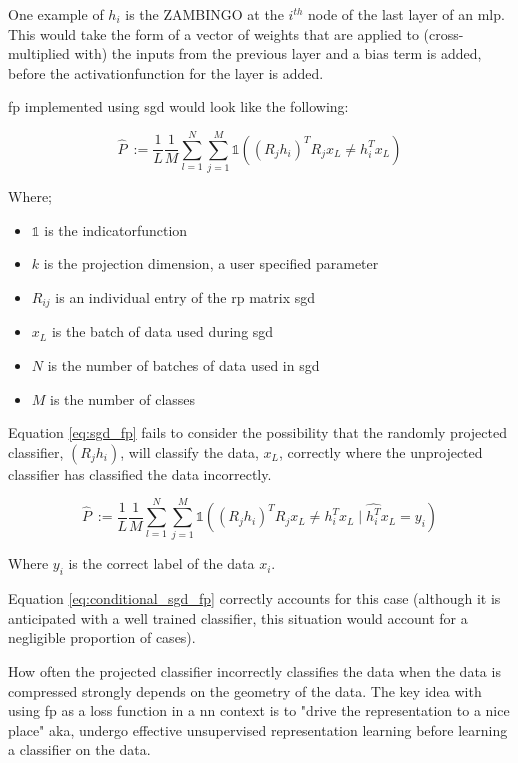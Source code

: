 One example of $h_i$ is the ZAMBINGO at the $i^{th}$ node of the last layer of an \gls{mlp}. This would take the form of a vector of weights that are applied to (cross-multiplied with) the inputs from the previous layer and a bias term is added, before the \gls{activationfunction} for the layer is added.
\bigskip

\bigskip

 \gls{fp} implemented using  \gls{sgd} would look like the following:

\begin{equation}
\label{eq:sgd_fp}
\hat{P}\ := \frac{1}{L}\frac{1}{M}\sum_{l = 1}^N \sum_{j = 1}^M \mathds{1}((R_j h_i)^T R_jx_L \neq h_i^Tx_L)  
\end{equation}

Where;  \smallskip

\begin{itemize}
\item $\mathds{1}$ is the \gls{indicatorfunction}  
\item $k$ is the projection dimension, a user specified parameter 
\item $R_{ij}$ is an individual entry of the \gls{rp} matrix  \gls{sgd} 
\item $x_L$ is the batch of data used during  \gls{sgd}  
\item $N$ is the number of batches of data used in  \gls{sgd}  
\item $M$ is the number of classes %
\end{itemize}

Equation \ref{eq:sgd_fp} fails to consider the possibility that the randomly projected classifier,  $(R_j h_i)$, will classify the data, $x_L$, correctly where the unprojected classifier has classified the data incorrectly.
\bigskip

\begin{equation}
\label{eq:conditional_sgd_fp}
\hat{P}\ := \frac{1}{L}\frac{1}{M}\sum_{l = 1}^N \sum_{j = 1}^M  \mathds{1}( (R_j h_i)^T R_jx_L \neq h_i^Tx_L \mid \hat{h_i^T}x_L = y_i )  
\end{equation}

Where $y_i$ is the correct label of the data $x_i$. 
\bigskip

Equation \ref{eq:conditional_sgd_fp} correctly accounts for this case (although it is anticipated with a well trained classifier, this situation would account for a negligible proportion of cases). 
\bigskip

How often the projected classifier incorrectly classifies the data when the data is compressed strongly depends on the  geometry of the data. The key idea with using  \gls{fp} as a loss function in a  \gls{nn} context is to "drive the representation to a nice place" aka, undergo effective unsupervised representation learning before learning a classifier on the data. 
\bigskip

